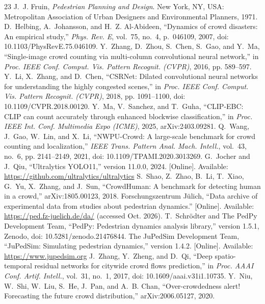 \documentclass[conference]{IEEEtran}
\begin{document}
\begin{thebibliography}{23}
 J.~J. Fruin, \emph{Pedestrian Planning and Design}. New York, NY, USA: Metropolitan Association of Urban Designers and Environmental Planners, 1971.
 D.~Helbing, A.~Johansson, and H.~Z. Al-Abideen, ``Dynamics of crowd disasters: An empirical study,'' \emph{Phys. Rev. E}, vol.~75, no.~4, p.~046109, 2007, doi: 10.1103/PhysRevE.75.046109.
 Y.~Zhang, D.~Zhou, S.~Chen, S.~Gao, and Y.~Ma, ``Single-image crowd counting via multi-column convolutional neural network,'' in \emph{Proc. IEEE Conf. Comput. Vis. Pattern Recognit. (CVPR)}, 2016, pp. 589--597.
 Y.~Li, X.~Zhang, and D.~Chen, ``CSRNet: Dilated convolutional neural networks for understanding the highly congested scenes,'' in \emph{Proc. IEEE Conf. Comput. Vis. Pattern Recognit. (CVPR)}, 2018, pp. 1091--1100, doi: 10.1109/CVPR.2018.00120.
 Y.~Ma, V.~Sanchez, and T.~Guha, ``CLIP-EBC: CLIP can count accurately through enhanced blockwise classification,'' in \emph{Proc. IEEE Int. Conf. Multimedia Expo (ICME)}, 2025, arXiv:2403.09281.
 Q.~Wang, J.~Gao, W.~Lin, and X.~Li, ``NWPU-Crowd: A large-scale benchmark for crowd counting and localization,'' \emph{IEEE Trans. Pattern Anal. Mach. Intell.}, vol.~43, no.~6, pp. 2141--2149, 2021, doi: 10.1109/TPAMI.2020.3013269.
 G.~Jocher and J.~Qiu, ``Ultralytics YOLO11,'' version 11.0.0, 2024. [Online]. Available: \url{https://github.com/ultralytics/ultralytics}
 S.~Shao, Z.~Zhao, B.~Li, T.~Xiao, G.~Yu, X.~Zhang, and J.~Sun, ``CrowdHuman: A benchmark for detecting human in a crowd,'' arXiv:1805.00123, 2018.
 Forschungszentrum J\"ulich, ``Data archive of experimental data from studies about pedestrian dynamics.'' [Online]. Available: \url{https://ped.fz-juelich.de/da/} (accessed Oct. 2026).
 T.~Schr\"odter and The PedPy Development Team, ``PedPy: Pedestrian dynamics analysis library,'' version 1.5.1, Zenodo, doi: 10.5281/zenodo.21476844.
 The JuPedSim Development Team, ``JuPedSim: Simulating pedestrian dynamics,'' version 1.4.2. [Online]. Available: \url{https://www.jupedsim.org}
 J.~Zhang, Y.~Zheng, and D.~Qi, ``Deep spatio-temporal residual networks for citywide crowd flows prediction,'' in \emph{Proc. AAAI Conf. Artif. Intell.}, vol.~31, no.~1, 2017, doi: 10.1609/aaai.v31i1.10735.
 Y.~Niu, W.~Shi, W.~Liu, S.~He, J.~Pan, and A.~B. Chan, ``Over-crowdedness alert! Forecasting the future crowd distribution,'' arXiv:2006.05127, 2020.

\end{thebibliography}
\end{document}
